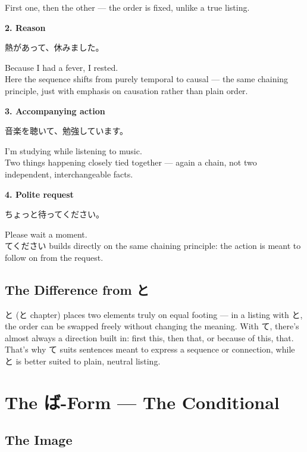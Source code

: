 \documentclass[12pt]{book}
\begin{document}
First one, then the other — the order is fixed, unlike a true listing.

\textbf{2. Reason}
\par\quad 熱があって、休みました。\\
\par\quad Because I had a fever, I rested.\\

Here the sequence shifts from purely temporal to causal — the same chaining principle, just with emphasis on causation rather than plain order.

\textbf{3. Accompanying action}
\par\quad 音楽を聴いて、勉強しています。\\
\par\quad I'm studying while listening to music.\\

Two things happening closely tied together — again a chain, not two independent, interchangeable facts.

\textbf{4. Polite request}
\par\quad ちょっと待ってください。\\
\par\quad Please wait a moment.\\

てください builds directly on the same chaining principle: the action is meant to follow on from the request.

\section*{The Difference from と}

と (と chapter) places two elements truly on equal footing — in a listing with と, the order can be swapped freely without changing the meaning. With て, there's almost always a direction built in: first this, then that, or because of this, that. That's why て suits sentences meant to express a sequence or connection, while と is better suited to plain, neutral listing.


\chapter{The ば-Form — The Conditional}

\section*{The Image}
\end{document}
